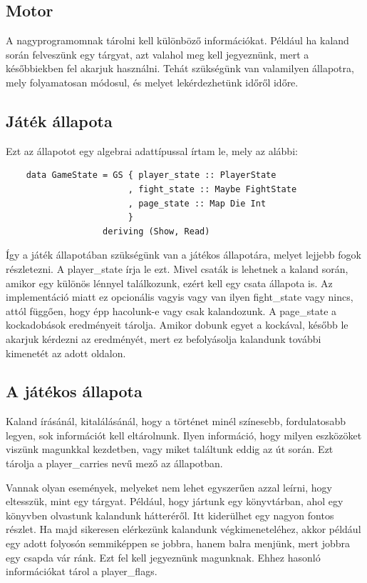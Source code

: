\documentclass[12pt,a4paper,oneside]{report}
\newcommand{\xstate}[1]{{\color{State}#1}}
\begin{document}
    \subsection{Motor}
    A nagyprogramomnak tárolni kell különböző információkat. Például ha
    kaland során felveszünk egy tárgyat, azt valahol meg kell jegyeznünk, mert a
    későbbiekben fel akarjuk használni. Tehát szükségünk van valamilyen
    állapotra, mely folyamatosan módosul, és melyet lekérdezhetünk
    időről időre.
    \subsection{Játék állapota}
    Ezt az állapotot egy algebrai adattípussal írtam le, mely az
    alábbi:
    \begin{verbatim}
    data GameState = GS { player_state :: PlayerState
                        , fight_state :: Maybe FightState
                        , page_state :: Map Die Int
                        }
                   deriving (Show, Read)
    \end{verbatim}
    Így a játék állapotában szükségünk van a játékos állapotára,
    melyet lejjebb fogok részletezni. A \xstate{player\_state} írja le
    ezt. Mivel csaták is lehetnek a kaland során, amikor egy különös
    lénnyel találkozunk, ezért kell egy csata állapota is. Az
    implementáció miatt ez opcionális vagyis vagy van ilyen
    \xstate{fight\_state} vagy nincs, attól függően, hogy épp hacolunk-e vagy
    csak kalandozunk. A \xstate{page\_state} a kockadobások eredményeit
    tárolja. Amikor dobunk egyet a kockával, később le akarjuk
    kérdezni az eredményét, mert ez befolyásolja kalandunk további
    kimenetét az adott oldalon.
    
    \subsection{A játékos állapota}
    Kaland írásánál, kitalálásánál, hogy a történet minél színesebb,
    fordulatosabb legyen, sok információt kell eltárolnunk. Ilyen
    információ, hogy milyen eszközöket viszünk magunkkal kezdetben,
    vagy miket találtunk eddig az út során.  Ezt tárolja a
    \xstate{player\_carries} nevű mező az állapotban.

    Vannak olyan események, melyeket nem lehet egyszerűen azzal
    leírni, hogy eltesszük, mint egy tárgyat. Például, hogy jártunk
    egy könyvtárban, ahol egy könyvben olvastunk kalandunk hátteréről.
    Itt kiderülhet egy nagyon fontos részlet. Ha majd sikeresen elérkezünk
    kalandunk végkimeneteléhez, akkor például egy adott folyosón
    semmiképpen se jobbra, hanem balra menjünk, mert jobbra egy csapda
    vár ránk. Ezt fel kell jegyeznünk magunknak. Ehhez hasonló
    információkat tárol a \xstate{player\_flags}.
\end{document}
